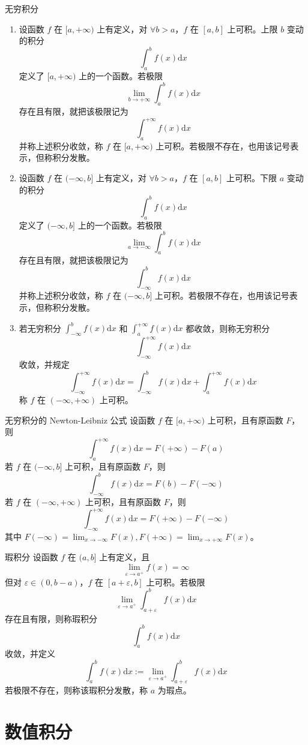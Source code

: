 \begin{definition}{无穷积分}
    \begin{enumerate}
        \item 设函数 $f$ 在 $[a, +\infty)$ 上有定义，对 $\forall b > a$，$f$ 在 $[a, b]$ 上可积。上限 $b$ 变动的积分
              \[\int_{a}^{b}f(x)\mathrm{d}x\]
              定义了 $[a, +\infty)$ 上的一个函数。若极限
              \[\lim_{b \to +\infty}\int_{a}^{b}f(x)\mathrm{d}x\]
              存在且有限，就把该极限记为
              \[\int_{a}^{+\infty}f(x)\mathrm{d}x\]
              并称上述积分收敛，称 $f$ 在 $[a,+\infty)$ 上可积。若极限不存在，也用该记号表示，但称积分发散。
        \item 设函数 $f$ 在 $(-\infty, b]$ 上有定义，对 $\forall b > a$，$f$ 在 $[a, b]$ 上可积。下限 $a$ 变动的积分
              \[\int_{a}^{b}f(x)\mathrm{d}x\]
              定义了 $(-\infty, b]$ 上的一个函数。若极限
              \[\lim_{a \to -\infty}\int_{a}^{b}f(x)\mathrm{d}x\]
              存在且有限，就把该极限记为
              \[\int_{-\infty}^{b}f(x)\mathrm{d}x\]
              并称上述积分收敛，称 $f$ 在 $(-\infty, b]$ 上可积。若极限不存在，也用该记号表示，但称积分发散。
        \item 若无穷积分 $\displaystyle \int_{-\infty}^{b}f(x)\mathrm{d}x$ 和 $\displaystyle \int_{a}^{+\infty}f(x)\mathrm{d}x$ 都收敛，则称无穷积分
              \[\int_{-\infty}^{+\infty}f(x)\mathrm{d}x\]
              收敛，并规定
              \[\int_{-\infty}^{+\infty}f(x)\mathrm{d}x = \int_{-\infty}^{b}f(x)\mathrm{d}x + \int_{a}^{+\infty}f(x)\mathrm{d}x\]
              称 $f$ 在 $(-\infty, +\infty)$ 上可积。
    \end{enumerate}
\end{definition}

\begin{theorem}{无穷积分的 Newton-Leibniz 公式}
    设函数 $f$ 在 $[a,+\infty)$ 上可积，且有原函数 $F$，则
    \[\int_{a}^{+\infty}f(x)\mathrm{d}x = F(+\infty) - F(a)\]
    若 $f$ 在 $(-\infty, b]$ 上可积，且有原函数 $F$，则
    \[\int_{-\infty}^{b}f(x)\mathrm{d}x = F(b) - F(-\infty)\]
    若 $f$ 在 $(-\infty, +\infty)$ 上可积，且有原函数 $F$，则
    \[\int_{-\infty}^{+\infty}f(x)\mathrm{d}x = F(+\infty) - F(-\infty)\]
    其中 $F(-\infty) = \lim_{x \to -\infty}F(x), F(+\infty) = \lim_{x \to +\infty}F(x)$。
\end{theorem}

\begin{definition}{瑕积分}
    设函数 $f$ 在 $(a,b]$ 上有定义，且
    \[\lim_{\varepsilon \to a^{+}}f(x) = \infty\]
    但对 $\varepsilon \in (0, b - a)$，$f$ 在 $[a + \varepsilon, b]$ 上可积。若极限
    \[\lim_{\varepsilon \to a^{+}}\int_{a + \varepsilon}^{b}f(x)\mathrm{d}x\]
    存在且有限，则称瑕积分
    \[\int_{a}^{b}f(x)\mathrm{d}x\]
    收敛，并定义
    \[\int_{a}^{b}f(x)\mathrm{d}x := \lim_{\varepsilon \to a^{+}}\int_{a + \varepsilon}^{b}f(x)\mathrm{d}x\]
    若极限不存在，则称该瑕积分发散，称 $a$ 为瑕点。
\end{definition}




\section{数值积分}






